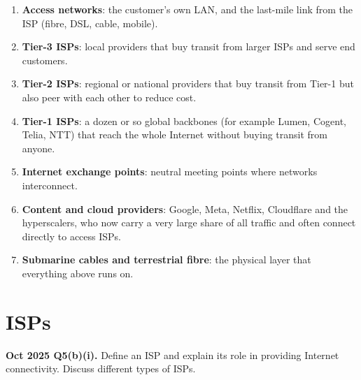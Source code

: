 \documentclass[11pt,a4paper]{article}
\begin{document}
\begin{solbox}
\begin{enumerate}
\item \textbf{Access networks}: the customer's own LAN, and the last-mile link from the ISP (fibre, DSL, cable, mobile).
\item \textbf{Tier-3 ISPs}: local providers that buy transit from larger ISPs and serve end customers.
\item \textbf{Tier-2 ISPs}: regional or national providers that buy transit from Tier-1 but also peer with each other to reduce cost.
\item \textbf{Tier-1 ISPs}: a dozen or so global backbones (for example Lumen, Cogent, Telia, NTT) that reach the whole Internet without buying transit from anyone.
\item \textbf{Internet exchange points}: neutral meeting points where networks interconnect.
\item \textbf{Content and cloud providers}: Google, Meta, Netflix, Cloudflare and the hyperscalers, who now carry a very large share of all traffic and often connect directly to access ISPs.
\item \textbf{Submarine cables and terrestrial fibre}: the physical layer that everything above runs on.
\end{enumerate}
\end{solbox}

\section{ISPs}

\begin{pyqbox}
\textbf{Oct 2025 Q5(b)(i).} Define an ISP and explain its role in providing Internet connectivity. Discuss different types of ISPs.
\end{pyqbox}
\end{document}
